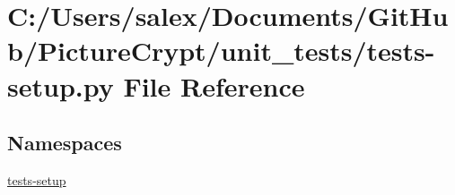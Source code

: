 \hypertarget{tests-setup_8py}{}\section{C\+:/\+Users/salex/\+Documents/\+Git\+Hub/\+Picture\+Crypt/unit\+\_\+tests/tests-\/setup.py File Reference}
\label{tests-setup_8py}
\subsection*{Namespaces}
\begin{DoxyCompactItemize}
\item 
 \mbox{\hyperlink{namespacetests-setup}{tests-\/setup}}
\end{DoxyCompactItemize}
